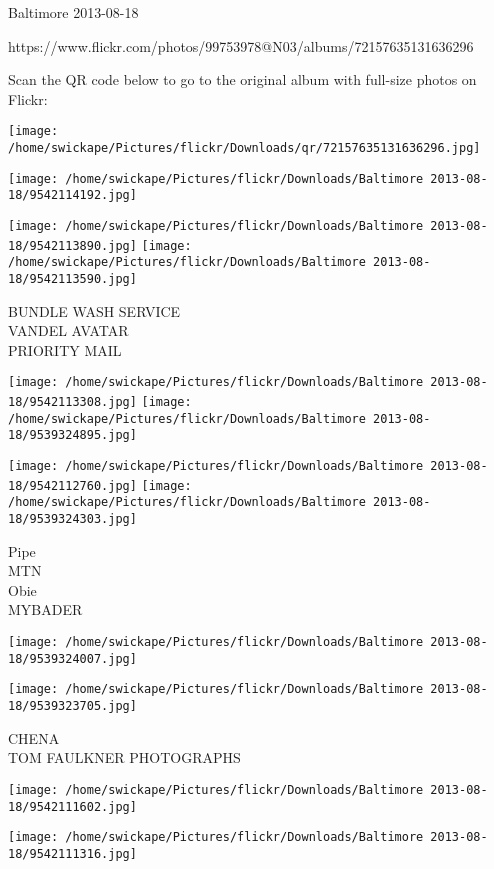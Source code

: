 \documentclass[10pt,letterpaper]{article}
\begin{document}
Baltimore 2013-08-18

https://www.flickr.com/photos/99753978@N03/albums/72157635131636296

Scan the QR code below to go to the original album with full-size photos on Flickr:

\texttt{[image: /home/swickape/Pictures/flickr/Downloads/qr/72157635131636296.jpg]}
\pagebreak

\texttt{[image: /home/swickape/Pictures/flickr/Downloads/Baltimore 2013-08-18/9542114192.jpg]}

\vspace{0.25in}
\texttt{[image: /home/swickape/Pictures/flickr/Downloads/Baltimore 2013-08-18/9542113890.jpg]}
\texttt{[image: /home/swickape/Pictures/flickr/Downloads/Baltimore 2013-08-18/9542113590.jpg]}

BUNDLE WASH SERVICE\\
VANDEL AVATAR\\
PRIORITY MAIL
\pagebreak

\texttt{[image: /home/swickape/Pictures/flickr/Downloads/Baltimore 2013-08-18/9542113308.jpg]}
\texttt{[image: /home/swickape/Pictures/flickr/Downloads/Baltimore 2013-08-18/9539324895.jpg]}

\texttt{[image: /home/swickape/Pictures/flickr/Downloads/Baltimore 2013-08-18/9542112760.jpg]}
\texttt{[image: /home/swickape/Pictures/flickr/Downloads/Baltimore 2013-08-18/9539324303.jpg]}

Pipe\\
MTN\\
Obie\\
MYBADER
\pagebreak

\texttt{[image: /home/swickape/Pictures/flickr/Downloads/Baltimore 2013-08-18/9539324007.jpg]}

\vspace{0.25in}
\texttt{[image: /home/swickape/Pictures/flickr/Downloads/Baltimore 2013-08-18/9539323705.jpg]}

CHENA\\
TOM FAULKNER PHOTOGRAPHS
\pagebreak

\texttt{[image: /home/swickape/Pictures/flickr/Downloads/Baltimore 2013-08-18/9542111602.jpg]}

\vspace{0.25in}
\texttt{[image: /home/swickape/Pictures/flickr/Downloads/Baltimore 2013-08-18/9542111316.jpg]}
\end{document}
